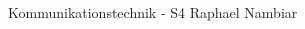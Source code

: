 \documentclass[10pt, a4paper, landscape]{extarticle}
\begin{document}
\begin{multicols*}{3}

    \DocumentInfo
    {Kommunikationstechnik - S4} %
    {Raphael Nambiar} %

    
    
    
    
    
    
    
    

\end{multicols*}
\begin{multicols*}{2}
    
\end{multicols*}
\end{document}
